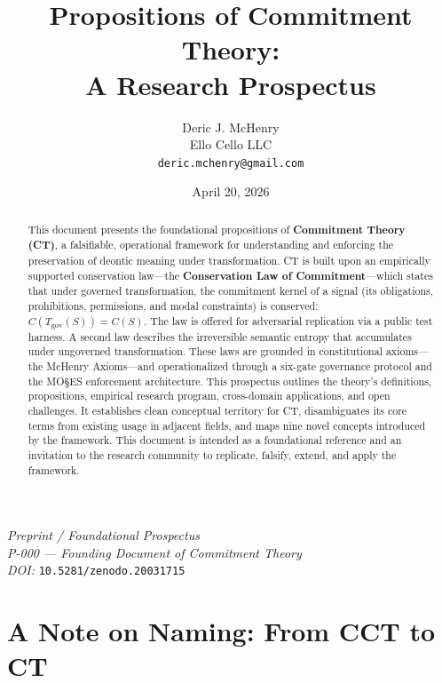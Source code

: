 \documentclass[11pt,a4paper]{article}
\title{Propositions of Commitment Theory:\\A Research Prospectus}
\author{
    Deric J. McHenry \\
    Ello Cello LLC \\
    \texttt{deric.mchenry@gmail.com}
}
\date{April 20, 2026}
\begin{document}
\maketitle

\begin{center}
\textit{Preprint / Foundational Prospectus} \\[0.4em]
\textit{P-000 --- Founding Document of Commitment Theory} \\[0.4em]
\textit{DOI:} \texttt{10.5281/zenodo.20031715}
\end{center}

\begin{abstract}
This document presents the foundational propositions of \textbf{Commitment Theory (CT)}, a falsifiable, operational framework for understanding and enforcing the preservation of deontic meaning under transformation. CT is built upon an empirically supported conservation law---the \textbf{Conservation Law of Commitment}---which states that under governed transformation, the commitment kernel of a signal (its obligations, prohibitions, permissions, and modal constraints) is conserved: $C(T_{\text{gov}}(S)) = C(S)$. The law is offered for adversarial replication via a public test harness. A second law describes the irreversible semantic entropy that accumulates under ungoverned transformation. These laws are grounded in constitutional axioms---the McHenry Axioms---and operationalized through a six-gate governance protocol and the MO\S{}ES\texttrademark{} enforcement architecture. This prospectus outlines the theory's definitions, propositions, empirical research program, cross-domain applications, and open challenges. It establishes clean conceptual territory for CT, disambiguates its core terms from existing usage in adjacent fields, and maps nine novel concepts introduced by the framework. This document is intended as a foundational reference and an invitation to the research community to replicate, falsify, extend, and apply the framework.
\end{abstract}

\section*{A Note on Naming: From CCT to CT}
\end{document}
